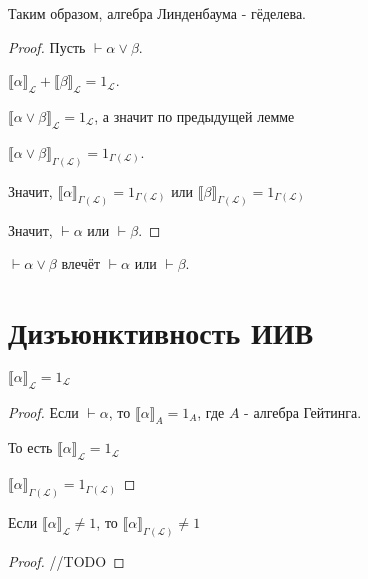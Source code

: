 \begin{theorem}
Таким образом, алгебра Линденбаума - гёделева.
\end{theorem}
\begin{proof}
Пусть $\vdash \alpha \lor \beta$.

${\llbracket \alpha \rrbracket}_{\mathcal{L}} + {\llbracket \beta \rrbracket}_{\mathcal{L}} = 1_{\mathcal{L}}$.

${\llbracket \alpha \lor \beta \rrbracket}_{\mathcal{L}} = 1_{\mathcal{L}}$, а значит по предыдущей лемме

${\llbracket \alpha \lor \beta \rrbracket}_{\Gamma(\mathcal{L})} = 1_{\Gamma(\mathcal{L})}$.

Значит, ${\llbracket \alpha \rrbracket}_{\Gamma(\mathcal{L})} = 1_{\Gamma(\mathcal{L})}$ или
${\llbracket \beta \rrbracket}_{\Gamma(\mathcal{L})} = 1_{\Gamma(\mathcal{L})}$

Значит, $\vdash \alpha$ или $\vdash \beta$.
\end{proof}

\begin{consequence}
$\vdash \alpha \lor \beta$ влечёт $\vdash \alpha$ или $\vdash \beta$.
\end{consequence}

\section{Дизъюнктивность ИИВ}

\begin{lemma}
${\llbracket \alpha \rrbracket}_{\mathcal{L}} = 1_{\mathcal{L}}$
\end{lemma}

\begin{proof}
Если $\vdash \alpha$, то ${\llbracket \alpha \rrbracket}_{A} = 1_{A}$, где $A$ - алгебра Гейтинга.

То есть ${\llbracket \alpha \rrbracket}_{\mathcal{L}} = 1_{\mathcal{L}}$

${\llbracket \alpha \rrbracket}_{\Gamma(\mathcal{L})} = 1_{\Gamma(\mathcal{L})}$
\end{proof}

\begin{lemma}
Если ${\llbracket \alpha \rrbracket}_{\mathcal{L}} \neq 1$, то ${\llbracket \alpha \rrbracket}_{\Gamma(\mathcal{L})} \neq 1$
\end{lemma}

\begin{proof}
//TODO
\end{proof}

